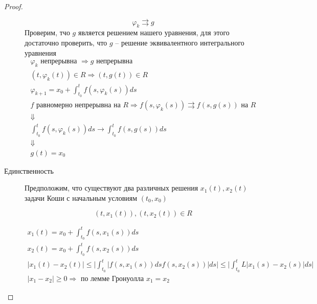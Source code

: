\documentclass[a4paper]{article}
\theoremstyle{indented}
\theoremstyle{definition}
\theoremstyle{remark}
\begin{document}
\begin{proof}
\begin{description}
    \[\varphi_k \rightrightarrows g\]
    Проверим, тчо $g$ является решением нашего уравнения, для этого достаточно проверить, что $g$ --  решение эквивалентного интегрального уравнения
    \begin{equation*}
      \begin{gathered}
        \varphi_k \text{ непрерывна } \Rightarrow g \text{ непрерывна }
        \\
        (t,\varphi_k(t)) \in R \Rightarrow (t,g(t)) \in R
        \\
        \varphi_{k+1} = x_0 + \int_{t_0}^{t}f(s,\varphi_k(s))ds
        \\
        f \text{ равномерно непрерывна на } R \Rightarrow f(s,\varphi_k(s)) \rightrightarrows f(s,g(s)) \text{ на } R
        \\
        \Downarrow
        \\
        \int_{t_0}^{t}f(s,\varphi_k(s))ds \to \int_{t_0}^{t}f(s,g(s))ds
        \\
        \Downarrow
        \\
        g(t) = x_0 
      \end{gathered}
    \end{equation*}
  \item[Единственность]
    Предположим, что существуют два различных решения $x_1(t), x_2(t)$ задачи Коши с начальным условиям $(t_0,x_0)$

    \[(t,x_1(t)), (t,x_2(t)) \in R\]

    \begin{equation*}
      \begin{gathered}
        x_1(t) = x_0 + \int_{t_0}^{t}f(s,x_1(s))ds \\
        x_2(t) = x_0 + \int_{t_0}^{t}f(s,x_2(s))ds \\
        |x_1(t) - x_2(t)| \leqslant \bigg| \int_{t_0}^{t}|f(s,x_1(s))ds f(s,x_2(s))|ds \bigg| \leqslant \bigg| \int_{t_0}^{t}L |x_1(s) - x_2(s)| ds \bigg| \\
        |x_1 - x_2| \geqslant 0 \Rightarrow \text{ по лемме Гронуолла } x_1 = x_2
      \end{gathered}
    \end{equation*}
  \end{description}
\end{proof}
\end{document}
